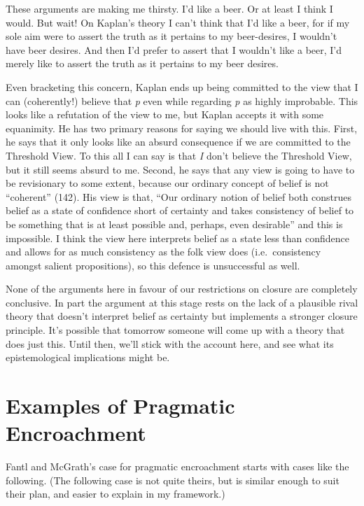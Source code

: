 \documentclass[
  11pt,
  letterpaper,
  DIV=11,
  numbers=noendperiod,
  twoside]{scrartcl}
\begin{document}
These arguments are making me thirsty. I'd like a beer. Or at least I
think I would. But wait! On Kaplan's theory I can't think that I'd like
a beer, for if my sole aim were to assert the truth as it pertains to my
beer-desires, I wouldn't have beer desires. And then I'd prefer to
assert that I wouldn't like a beer, I'd merely like to assert the truth
as it pertains to my beer desires.

Even bracketing this concern, Kaplan ends up being committed to the view
that I can (coherently!) believe that \emph{p} even while regarding
\emph{p} as highly improbable. This looks like a refutation of the view
to me, but Kaplan accepts it with some equanimity. He has two primary
reasons for saying we should live with this. First, he says that it only
looks like an absurd consequence if we are committed to the Threshold
View. To this all I can say is that \emph{I} don't believe the Threshold
View, but it still seems absurd to me. Second, he says that any view is
going to have to be revisionary to some extent, because our ordinary
concept of belief is not ``coherent'' (142). His view is that, ``Our
ordinary notion of belief both construes belief as a state of confidence
short of certainty and takes consistency of belief to be something that
is at least possible and, perhaps, even desirable'' and this is
impossible. I think the view here interprets belief as a state less than
confidence and allows for as much consistency as the folk view does
(i.e.~consistency amongst salient propositions), so this defence is
unsuccessful as well.

None of the arguments here in favour of our restrictions on closure are
completely conclusive. In part the argument at this stage rests on the
lack of a plausible rival theory that doesn't interpret belief as
certainty but implements a stronger closure principle. It's possible
that tomorrow someone will come up with a theory that does just this.
Until then, we'll stick with the account here, and see what its
epistemological implications might be.

\section{Examples of Pragmatic
Encroachment}\label{examples-of-pragmatic-encroachment}

Fantl and McGrath's case for pragmatic encroachment starts with cases
like the following. (The following case is not quite theirs, but is
similar enough to suit their plan, and easier to explain in my
framework.)
\end{document}
